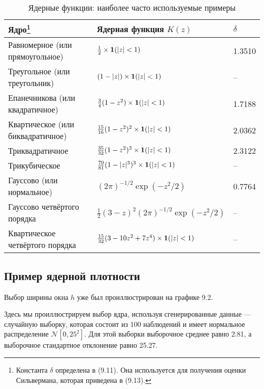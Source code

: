 \begin{table}[h]
\begin{center}
\caption{\label{tab:kernelf} Ядерные функции: наиболее часто используемые примеры}
\begin{minipage}{16.5cm}
\begin{tabular}[t]{lll}
\hline
\hline
\bf{Ядро}\footnote{Константа $\delta$ определена в (9.11). Она используется для получения оценки Сильвермана, которая приведена в (9.13).} & \bf{Ядерная функция $K(z)$} & \bf{$\delta$} \\
\hline
Равномерное (или прямоугольное) & $\frac{1}{2} \times {\bf{1}} (|z| < 1)$ & 1.3510 \\
Треугольное (или треугольник) & $(1 - |z|) \times {\bf{1}} (|z| < 1)$ & -- \\
Епанечникова (или квадратичное) & $\frac{3}{4} (1 - z^2) \times {\bf{1}} (|z| < 1)$ & 1.7188 \\
Квартическое (или биквадратичное) & $\frac{15}{16} (1 - z^2)^2 \times {\bf{1}} (|z| < 1)$ & 2.0362 \\
Триквадратичное & $\frac{35}{32} (1 - z^2)^3 \times {\bf{1}} (|z| < 1)$ & 2.3122 \\
Трикубическое & $\frac{70}{81} (1 - |z|^3)^3 \times {\bf{1}} (|z| < 1)$ & -- \\
Гауссово (или нормальное) & $(2\pi)^{-1/2}\exp(-z^2/2)$ & 0.7764 \\
Гауссово четвёртого порядка & $\frac{1}{2}(3-z)^2(2\pi)^{-1/2}\exp(-z^2/2)$ & -- \\
Квартическое четвёртого порядка & $\frac{15}{32}(3-10z^2+7z^4)\times {\bf{1}} (|z| < 1)$ & -- \\
\hline
\hline
\end{tabular}
\end{minipage}
\end{center}
\end{table}

\subsection{Пример ядерной плотности}

Выбор ширины окна $h$ уже был проиллюстрирован на графике 9.2.

Здесь мы проиллюстрируем выбор ядра, используя сгенерированные данные --- случайную выборку, которая состоит из 100 наблюдений и имеет нормальное распределение $\mathcal{N}[0,25^2]$. Для этой выборки выборочное среднее равно 2.81, а выборочное стандартное отклонение равно 25.27.


